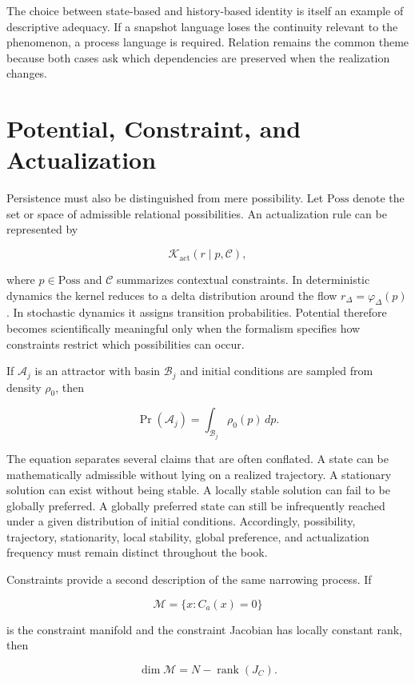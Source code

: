 The choice between state-based and history-based identity is itself an example of descriptive adequacy. If a snapshot language loses the continuity relevant to the phenomenon, a process language is required. Relation remains the common theme because both cases ask which dependencies are preserved when the realization changes.

\section{Potential, Constraint, and Actualization}

Persistence must also be distinguished from mere possibility. Let $\mathrm{Poss}$ denote the set or space of admissible relational possibilities. An actualization rule can be represented by

\[
\mathcal{K}_{\mathrm{act}}(r\mid p,\mathcal{C}),
\]

where $p\in\mathrm{Poss}$ and $\mathcal{C}$ summarizes contextual constraints. In deterministic dynamics the kernel reduces to a delta distribution around the flow $r_\Delta=\varphi_\Delta(p)$. In stochastic dynamics it assigns transition probabilities. Potential therefore becomes scientifically meaningful only when the formalism specifies how constraints restrict which possibilities can occur.

If $\mathcal{A}_j$ is an attractor with basin $\mathcal{B}_j$ and initial conditions are sampled from density $\rho_0$, then

\[
\Pr(\mathcal{A}_j)=\int_{\mathcal{B}_j}\rho_0(p)\,dp.
\]

The equation separates several claims that are often conflated. A state can be mathematically admissible without lying on a realized trajectory. A stationary solution can exist without being stable. A locally stable solution can fail to be globally preferred. A globally preferred state can still be infrequently reached under a given distribution of initial conditions. Accordingly, possibility, trajectory, stationarity, local stability, global preference, and actualization frequency must remain distinct throughout the book.

Constraints provide a second description of the same narrowing process. If

\[
\mathcal{M}=\{x:C_a(x)=0\}
\]

is the constraint manifold and the constraint Jacobian has locally constant rank, then

\[
\dim\mathcal{M}=N-\operatorname{rank}(J_C).
\]

